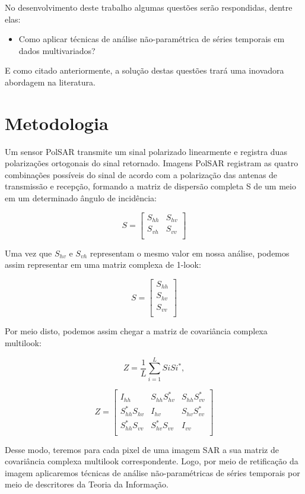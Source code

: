 \documentclass[12pt]{ctexart}
\begin{document}
No desenvolvimento deste trabalho algumas questões serão respondidas, dentre elas:

\begin{itemize}
    \item Como aplicar técnicas de análise não-paramétrica de séries temporais em dados multivariados?
\end{itemize}

E como citado anteriormente, a solução destas questões trará uma inovadora abordagem na literatura.

\section*{Metodologia}

Um sensor PolSAR transmite um sinal polarizado linearmente e registra duas polarizações ortogonais do sinal retornado. Imagens PolSAR registram as quatro combinações possíveis do sinal de acordo com a polarização das antenas de transmissão e recepção, formando a matriz de dispersão completa S de um meio em um determinado ângulo de incidência:

 \[
   S=
  \left[ {\begin{array}{cc}
   S_{hh} & S_{hv}\\
   S_{vh} & S_{vv}\\
  \end{array} } \right]
\]

Uma vez que $S_{hv}$ e $S_{vh}$ representam o mesmo valor em nossa análise, podemos assim representar em uma matriz complexa de 1-look:

 \[
   S=
  \left[ {\begin{array}{c}
   S_{hh}\\
   S_{hv}\\
   S_{vv}\\
  \end{array} } \right]
\]

Por meio disto, podemos assim chegar a matriz de covariância complexa multilook:


\begin{equation}
Z=\frac{1}{L} \sum_{i=1}^{L} SiSi^*, 
\end{equation}


 \[
   Z=
  \left[ {\begin{array}{ccc}
   I_{hh} & S_{hh}S_{hv}^* & S_{hh}S_{vv}^*\\
   S_{hh}^*S_{hv} & I_{hv} & S_{hv}S_{vv}^*\\
   S_{hh}^*S_{vv} & S_{hv}^*S_{vv} & I_{vv}\\
  \end{array} } \right]
\]

Desse modo, teremos para cada pixel de uma imagem SAR a sua matriz de covariância complexa multilook correspondente. Logo, por meio de retificação da imagem aplicaremos técnicas de análise não-paramétricas de séries temporais por meio de descritores da Teoria da Informação.

 

\end{document}
